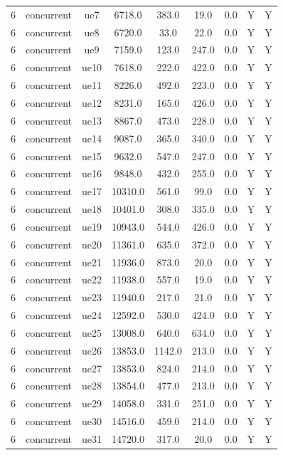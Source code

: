 \begin{table}[ht]
\begin{tabular}{|c|c|c|c|c|c|c|c|c|}
6 & concurrent & ue7 & 6718.0 & 383.0 & 19.0 & 0.0 & Y & Y \\
6 & concurrent & ue8 & 6720.0 & 33.0 & 22.0 & 0.0 & Y & Y \\
6 & concurrent & ue9 & 7159.0 & 123.0 & 247.0 & 0.0 & Y & Y \\
6 & concurrent & ue10 & 7618.0 & 222.0 & 422.0 & 0.0 & Y & Y \\
6 & concurrent & ue11 & 8226.0 & 492.0 & 223.0 & 0.0 & Y & Y \\
6 & concurrent & ue12 & 8231.0 & 165.0 & 426.0 & 0.0 & Y & Y \\
6 & concurrent & ue13 & 8867.0 & 473.0 & 228.0 & 0.0 & Y & Y \\
6 & concurrent & ue14 & 9087.0 & 365.0 & 340.0 & 0.0 & Y & Y \\
6 & concurrent & ue15 & 9632.0 & 547.0 & 247.0 & 0.0 & Y & Y \\
6 & concurrent & ue16 & 9848.0 & 432.0 & 255.0 & 0.0 & Y & Y \\
6 & concurrent & ue17 & 10310.0 & 561.0 & 99.0 & 0.0 & Y & Y \\
6 & concurrent & ue18 & 10401.0 & 308.0 & 335.0 & 0.0 & Y & Y \\
6 & concurrent & ue19 & 10943.0 & 544.0 & 426.0 & 0.0 & Y & Y \\
6 & concurrent & ue20 & 11361.0 & 635.0 & 372.0 & 0.0 & Y & Y \\
6 & concurrent & ue21 & 11936.0 & 873.0 & 20.0 & 0.0 & Y & Y \\
6 & concurrent & ue22 & 11938.0 & 557.0 & 19.0 & 0.0 & Y & Y \\
6 & concurrent & ue23 & 11940.0 & 217.0 & 21.0 & 0.0 & Y & Y \\
6 & concurrent & ue24 & 12592.0 & 530.0 & 424.0 & 0.0 & Y & Y \\
6 & concurrent & ue25 & 13008.0 & 640.0 & 634.0 & 0.0 & Y & Y \\
6 & concurrent & ue26 & 13853.0 & 1142.0 & 213.0 & 0.0 & Y & Y \\
6 & concurrent & ue27 & 13853.0 & 824.0 & 214.0 & 0.0 & Y & Y \\
6 & concurrent & ue28 & 13854.0 & 477.0 & 213.0 & 0.0 & Y & Y \\
6 & concurrent & ue29 & 14058.0 & 331.0 & 251.0 & 0.0 & Y & Y \\
6 & concurrent & ue30 & 14516.0 & 459.0 & 214.0 & 0.0 & Y & Y \\
6 & concurrent & ue31 & 14720.0 & 317.0 & 20.0 & 0.0 & Y & Y \\

\end{tabular}
\end{table}
